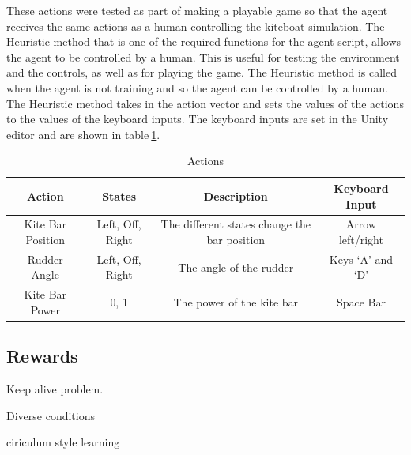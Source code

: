 These actions were tested as part of making a playable game so that the agent receives the same actions as a human controlling the kiteboat simulation. The Heuristic method that is one of the required functions for the agent script, allows the agent to be controlled by a human. This is useful for testing the environment and the controls, as well as for playing the game. The Heuristic method is called when the agent is not training and so the agent can be controlled by a human. The Heuristic method takes in the action vector and sets the values of the actions to the values of the keyboard inputs. The keyboard inputs are set in the Unity editor and are shown in table$~$\ref{actions}. 

\begin{table}[h]
    \centering
    \begin{tabular}{c|c|c|c}
        Action & States & Description & Keyboard Input\\
        \midrule
        Kite Bar Position & Left, Off, Right & The different states change the bar position & Arrow left/right \\
        Rudder Angle & Left, Off, Right & The angle of the rudder & Keys `A' and `D'\\
        Kite Bar Power & 0, 1 & The power of the kite bar & Space Bar \\
        \hline
    \end{tabular}
    \caption{Actions}\label{actions}
\end{table}


\subsection{Rewards}
Keep alive problem.

Diverse conditions

ciriculum style learning

